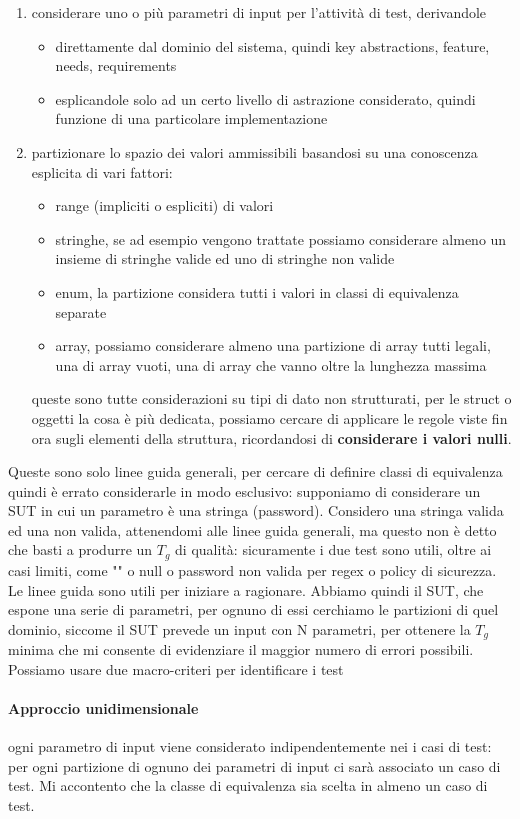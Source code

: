 \documentclass{article}
\begin{document}
\begin{enumerate}
\item considerare uno o più parametri di input per l'attività di test, derivandole
\begin{itemize}
\item direttamente dal dominio del sistema, quindi key abstractions, feature, needs, requirements 
\item esplicandole solo ad un certo livello di astrazione considerato, quindi funzione di una particolare implementazione
\end{itemize}
\item partizionare lo spazio dei valori ammissibili basandosi su una conoscenza esplicita di vari fattori:
\begin{itemize}
\item range (impliciti o espliciti) di valori
\item stringhe, se ad esempio vengono trattate possiamo considerare almeno un insieme di stringhe valide ed uno di stringhe non valide
\item enum, la partizione considera tutti i valori in classi di equivalenza separate
\item array, possiamo considerare almeno una partizione di array tutti legali, una di array vuoti, una di array che vanno oltre la lunghezza massima
\end{itemize}
queste sono tutte considerazioni su tipi di dato non strutturati, per le struct o oggetti la cosa è più dedicata, possiamo cercare di applicare le regole viste fin ora sugli elementi della struttura, ricordandosi di 	\textbf{considerare i valori nulli}.
\end{enumerate}
Queste sono solo linee guida generali, per cercare di definire classi di equivalenza quindi è errato considerarle in modo esclusivo: supponiamo di considerare un SUT in cui un parametro è una stringa (password). Considero una stringa valida ed una non valida, attenendomi alle linee guida generali, ma questo non è detto che basti a produrre un $T_g$ di qualità: sicuramente i due test sono utili, oltre ai casi limiti, come "" o null o password non valida per regex o policy di sicurezza. Le linee guida sono utili per iniziare a ragionare. Abbiamo quindi il SUT, che espone una serie di parametri, per ognuno di essi cerchiamo le partizioni di quel dominio, siccome il SUT prevede un input con N parametri, per ottenere la $T_g$ minima che mi consente di evidenziare il maggior numero di errori possibili. Possiamo usare due macro-criteri per identificare i test
\paragraph{Approccio unidimensionale}ogni parametro di input viene considerato indipendentemente nei i casi di test: per ogni partizione di ognuno dei parametri di input ci sarà associato un caso di test. Mi accontento che la classe di equivalenza sia scelta in almeno un caso di test.
\end{document}
